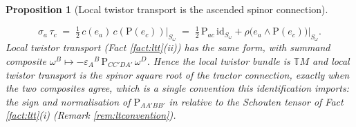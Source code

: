 \documentclass[11pt]{article}
\newtheorem{proposition}[theorem]{Proposition}
\theoremstyle{definition}
\newcommand{\T}{\mathbb{T}}
\newcommand{\id}{\mathrm{id}}
\newcommand{\Som}{S_\omega}
\begin{document}
\begin{proposition}[Local twistor transport is the ascended spinor connection]
\begin{enumerate}
\[
\sigma_a\,\tau_c \;=\; \tfrac12\,c(e_a)\,c(\mathrm{P}(e_c))\big|_{\Som} \;=\; \tfrac12\,\mathrm{P}_{ac}\,\id_{\Som} + \rho\bigl(e_a\wedge\mathrm{P}(e_c)\bigr)\big|_{\Som} .
\]
Local twistor transport (Fact \ref{fact:ltt}(ii)) has the same form, with summand composite $\omega^B \mapsto -\varepsilon_A{}^B\,\mathrm{P}_{CC'DA'}\,\omega^D$. Hence the local twistor bundle is $\T M$ and local twistor transport is the spinor square root of the tractor connection, exactly when the two composites agree, which is a single convention this identification imports: the sign and normalisation of $\mathrm{P}_{AA'BB'}$ in \cite{PenroseRindler86} relative to the Schouten tensor of Fact \ref{fact:ltt}(i) (Remark \ref{rem:ltconvention}).
\end{enumerate}
\end{proposition}
\end{document}
